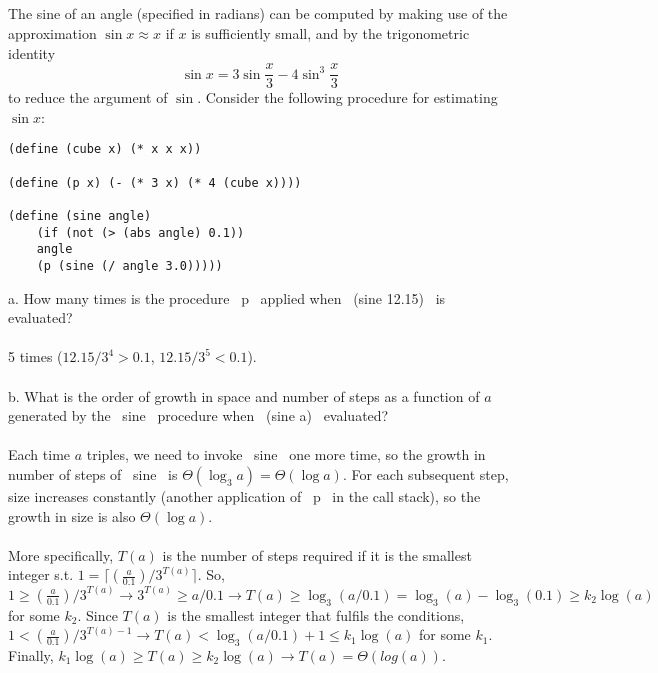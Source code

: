 \documentclass{article}
\begin{document}
\subsection{}
The sine of an angle (specified in radians) can be computed by making use of the approximation $\sin{x} \approx x$ if $x$ is sufficiently small, and by the trigonometric identity
\[ \sin{x} = 3\sin{\frac{x}{3}} - 4\sin^3\frac{x}{3} \]
to reduce the argument of $\sin$.
Consider the following procedure for estimating $\sin{x}$:
\begin{lstlisting}
(define (cube x) (* x x x))

(define (p x) (- (* 3 x) (* 4 (cube x))))

(define (sine angle)
    (if (not (> (abs angle) 0.1))
    angle
    (p (sine (/ angle 3.0)))))
\end{lstlisting}
a. How many times is the procedure ~p~ applied when ~(sine 12.15)~ is evaluated?\\ \\
5 times ($12.15 / 3^4 > 0.1$, $12.15 / 3^5 < 0.1$).\\ \\
b. What is the order of growth in space and number of steps as a function of $a$ generated by the ~sine~ procedure when ~(sine a)~ evaluated?\\ \\
Each time $a$ triples, we need to invoke ~sine~ one more time, so the growth in number of steps of ~sine~ is $\Theta(\log_3 a) = \Theta(\log a)$. For each subsequent step, size increases constantly (another application of ~p~ in the call stack), so the growth in size is also $\Theta(\log a)$.\\ \\
More specifically, $T(a)$ is the number of steps required if it is the smallest integer s.t. $1 = \lceil(\frac{a}{0.1}) / 3^{T(a)}\rceil$. So, $1 \ge (\frac{a}{0.1}) / 3^{T(a)} \rightarrow 3^{T(a)} \ge a/0.1 \rightarrow T(a) \ge \log_3(a/0.1) = \log_3(a) - \log_3(0.1) \ge k_2\log(a)$ for some $k_2$. Since $T(a)$ is the smallest integer that fulfils the conditions, $1 < (\frac{a}{0.1}) / 3^{T(a) - 1} \rightarrow T(a) < \log_3(a/0.1) + 1 \le k_1\log(a)$ for some $k_1$. Finally, $k_1 \log(a) \ge T(a) \ge k_2 \log(a) \rightarrow T(a) = \Theta(log(a))$.
\end{document}
